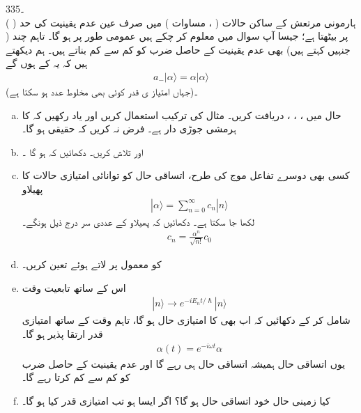 3۔35\\
 \quad ہارمونی مرتعش کے ساکن حالات ( ، مساوات ) میں صرف  عین عدم یقینیت کی
 حد ( ) پر بیٹھتا ہے؛ جیسا آپ سوال  میں معلوم کر چکے ہیں عمومی طور پر  ہو گا۔ تاہم چند  ( جنہیں کہتے ہیں) بھی عدم یقینیت کے حاصل ضرب کو کم سے کم بناتے ہیں۔ ہم دیکھتے ہیں کہ یہ  کے  ہوں گے
\begin{align*}
a_{-}|\alpha\rangle =\alpha|\alpha\rangle
\end{align*}
(جہاں امتیاز ی قدر  کوئی بھی مخلوط عدد ہو سکتا ہے)۔
\begin{enumerate}[a.] 
\item
حال  میں  ،  ،  ،  دریافت کریں۔  مثال  کی ترکیب استعمال کریں اور یاد رکھیں کہ  کا ہرمشی جوڑی دار  ہے۔ فرض نہ کریں کہ  حقیقی ہو گا۔ 
\item
{} اور  تلاش کریں۔ دکھائیں کہ  ہو گا ۔ 
\item
کسی بھی دوسرے تفاعل موج کی طرح، اتساقی حال کو توانائی امتیازی حالات کا پھیلاو 
 \begin{align*} 
|\alpha\rangle=\sum_{n=0}^{\infty}c_{n}|n\rangle 
 \end{align*} 
 لکھا جا سکتا ہے۔ دکھائیں کہ پھیلاو کے عددی سر درج ذیل ہونگے۔ 
 \begin{align*} 
c_{n}=\frac{\alpha^{n}}{\sqrt{n!}}c_{0} 
 \end{align*} 
\item
  کو معمول پر لاتے ہوئے  تعین کریں۔  
 \item
 اس کے ساتھ تابعیت وقت 
 \begin{align*} 
|n\rangle\to e^{-iE_{n}t/\hslash}|n\rangle 
 \end{align*} 
شامل کر کے دکھائیں کہ  اب بھی  کا امتیازی حال ہو گا، تاہم وقت کے ساتھ امتیازی قدر ارتقا پذیر ہو گا۔ 
 \begin{align*} 
\alpha(t)=e^{-i\omega t}\alpha 
 \end{align*} 
یوں اتساقی حال ہمیشہ اتساقی حال ہی رہے گا اور عدم یقینیت کے حاصل ضرب کو کم سے کم کرتا رہے گا۔ 
\item
کیا زمینی حال  خود اتساقی حال ہو گا؟ اگر ایسا ہو تب امتیازی قدر کیا ہو گا۔
\end{enumerate}

